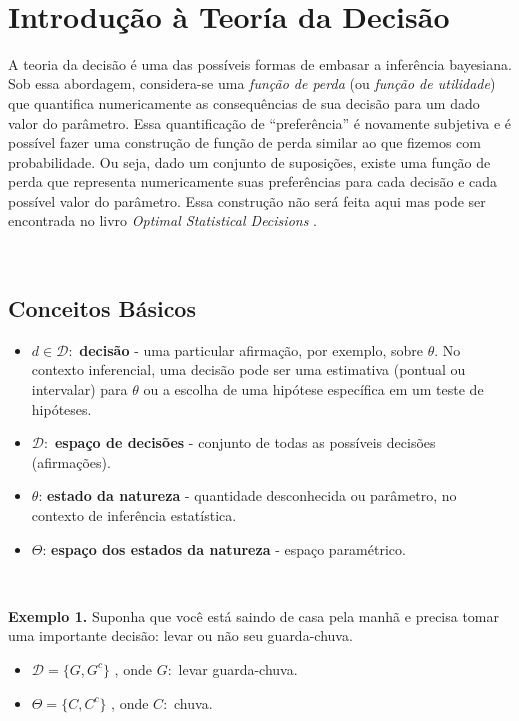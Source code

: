 \documentclass[
]{book}
\begin{document}
\(~\)

\hypertarget{TeoDec}{%
\chapter{Introdução à Teoría da Decisão}\label{TeoDec}}

A teoria da decisão é uma das possíveis formas de embasar a inferência bayesiana. Sob essa abordagem, considera-se uma \emph{função de perda} (ou \emph{função de utilidade}) que quantifica numericamente as consequências de sua decisão para um dado valor do parâmetro. Essa quantificação de ``preferência'' é novamente subjetiva e é possível fazer uma construção de função de perda similar ao que fizemos com probabilidade. Ou seja, dado um conjunto de suposições, existe uma função de perda que representa numericamente suas preferências para cada decisão e cada possível valor do parâmetro. Essa construção não será feita aqui mas pode ser encontrada no livro \emph{Optimal Statistical Decisions} \citep{DeGroot70}.

\(~\)

\hypertarget{BasDec}{%
\section{Conceitos Básicos}\label{BasDec}}

\begin{itemize}
\item
  \(d \in \mathcal{D}:\) \textbf{decisão} - uma particular afirmação, por exemplo, sobre \(\theta\). No contexto inferencial, uma decisão pode ser uma estimativa (pontual ou intervalar) para \(\theta\) ou a escolha de uma hipótese específica em um teste de hipóteses.
\item
  \(\mathcal{D}:\) \textbf{espaço de decisões} - conjunto de todas as possíveis decisões (afirmações).
\item
  \(\theta\): \textbf{estado da natureza} - quantidade desconhecida ou parâmetro, no contexto de inferência estatística.
\item
  \(\Theta\): \textbf{espaço dos estados da natureza} - espaço paramétrico.
\end{itemize}

\(~\)

\textbf{Exemplo 1.}
Suponha que você está saindo de casa pela manhã e precisa tomar uma importante decisão: levar ou não seu guarda-chuva.

\begin{itemize}
\item
  \(\mathcal{D}=\{G,G^c\}\) , onde \(G:\) levar guarda-chuva.
\item
  \(\Theta=\{C,C^c\}\) , onde \(C:\) chuva.
\end{itemize}
\end{document}
